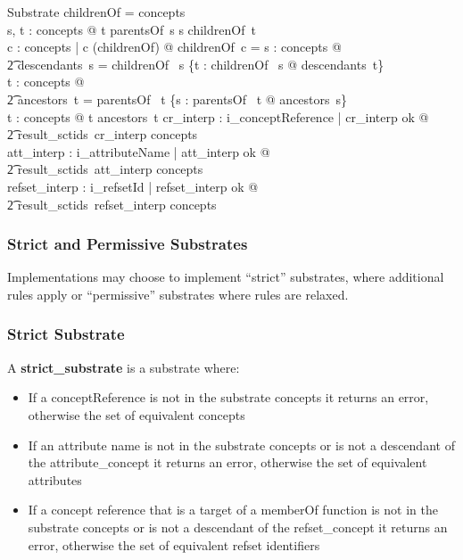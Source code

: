\documentclass{article}
\begin{document}
\begin{schema}{Substrate}
\also
    \dom childrenOf = concepts \\
    \forall s, t : concepts @ t \in parentsOf~s \iff s \in childrenOf~t  \\
    \forall c : concepts | c \notin \bigcup (\ran childrenOf) @ childrenOf~c = \emptyset 
\also
   \forall s : concepts @ \\
\t2 descendants~s = childrenOf~ s \cup \bigcup \{t : childrenOf~ s @ descendants~t\} \\
   \forall t : concepts @ \\
\t2 ancestors~t = parentsOf~ t \cup \bigcup \{s : parentsOf~ t @ ancestors~s\} \\
   \forall t : concepts @ t \notin ancestors~t
\also
   \forall cr\_interp : \ran i\_conceptReference | cr\_interp \in \ran ok @ \\
\t2 result\_sctids~cr\_interp \subseteq concepts \\
   \forall att\_interp : \ran i\_attributeName | att\_interp \in \ran ok @ \\
\t2 result\_sctids~att\_interp \subseteq concepts \\
   \forall refset\_interp : \ran i\_refsetId | refset\_interp \in \ran ok @ \\
\t2 result\_sctids~refset\_interp \subseteq concepts 
\end{schema}
\subsubsection{Strict and Permissive Substrates}
Implementations may choose to implement ``strict'' substrates, where additional rules apply or ``permissive'' substrates where rules are relaxed.
\subsubsection{Strict Substrate}
A \textbf{strict\_substrate} is a substrate where:
\begin{itemize}[noitemsep,nolistsep]
\item If a conceptReference is not in the substrate concepts it returns an error, otherwise the set of equivalent concepts
\item If an attribute name is not in the substrate concepts or is not a descendant of the attribute\_concept it returns an error, otherwise the set of equivalent attributes
\item If a concept reference that is a target of a memberOf function is not in the substrate concepts or is not a descendant of the refset\_concept it returns an error, otherwise the set of equivalent refset identifiers
\end{itemize}
\end{document}
